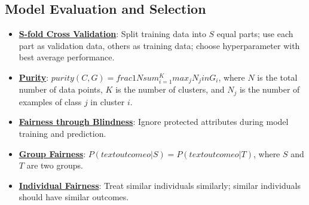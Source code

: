 \documentclass{article}%
\begin{document}
\subsection{Model Evaluation and Selection}%
\label{subsec:ModelEvaluationandSelection}%
\begin{itemize}[leftmargin=*]%
\item \href{https://purdue.brightspace.com/d2l/common/assets/pdfjs-d2l-dist/1.0.14-legacy/web/viewer.html?file=\%2Fcontent\%2Fenforced\%2F1095467-wl.202510.CS.24300.001\%2F10L1-CrossValidation.pdf\%3Fou\%3D1095467\&lang=en-us\&container=d2l-fileviewer-rendered-pdf\&fullscreen=d2l-fileviewer-rendered-pdf-dialog\&height=667#page=25}{\textbf{S-fold Cross Validation}}: Split training data into $S$ equal parts; use each part as validation data, others as training data; choose hyperparameter with best average performance.%
\item \href{https://purdue.brightspace.com/d2l/common/assets/pdfjs-d2l-dist/1.0.14-legacy/web/viewer.html?file=\%2Fcontent\%2Fenforced\%2F1095467-wl.202510.CS.24300.001\%2F12L2-distance-clusters.pdf\%3Fou\%3D1095467\&lang=en-us\&container=d2l-fileviewer-rendered-pdf\&fullscreen=d2l-fileviewer-rendered-pdf-dialog\&height=667#page=44}{\textbf{Purity}}: $purity(C, G) =  frac{1}{N}  sum_{i=1}^{K}  max_{j} N_j  in G_i$, where $N$ is the total number of data points, $K$ is the number of clusters, and $N_j$ is the number of examples of class $j$ in cluster $i$.%
\item \href{https://purdue.brightspace.com/d2l/common/assets/pdfjs-d2l-dist/1.0.14-legacy/web/viewer.html?file=\%2Fcontent\%2Fenforced\%2F1095467-wl.202510.CS.24300.001\%2F16L2-ethics.pdf\%3Fou\%3D1095467\&lang=en-us\&container=d2l-fileviewer-rendered-pdf\&fullscreen=d2l-fileviewer-rendered-pdf-dialog\&height=667#page=25}{\textbf{Fairness through Blindness}}: Ignore protected attributes during model training and prediction.%
\item \href{https://purdue.brightspace.com/d2l/common/assets/pdfjs-d2l-dist/1.0.14-legacy/web/viewer.html?file=\%2Fcontent\%2Fenforced\%2F1095467-wl.202510.CS.24300.001\%2F16L2-ethics.pdf\%3Fou\%3D1095467\&lang=en-us\&container=d2l-fileviewer-rendered-pdf\&fullscreen=d2l-fileviewer-rendered-pdf-dialog\&height=667#page=26}{\textbf{Group Fairness}}: $P( text{outcome } o | S) = P( text{outcome } o | T)$, where $S$ and $T$ are two groups.%
\item \href{https://purdue.brightspace.com/d2l/common/assets/pdfjs-d2l-dist/1.0.14-legacy/web/viewer.html?file=\%2Fcontent\%2Fenforced\%2F1095467-wl.202510.CS.24300.001\%2F16L2-ethics.pdf\%3Fou\%3D1095467\&lang=en-us\&container=d2l-fileviewer-rendered-pdf\&fullscreen=d2l-fileviewer-rendered-pdf-dialog\&height=667#page=27}{\textbf{Individual Fairness}}: Treat similar individuals similarly; similar individuals should have similar outcomes.%

\end{itemize}
\end{document}

